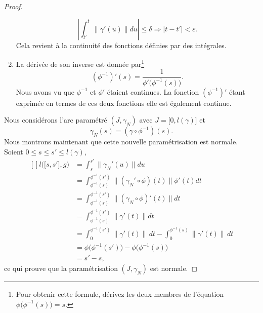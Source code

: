 \begin{proof}
\begin{enumerate}
            \begin{equation}
                |   \int_{t'}^t\big\| \gamma'(u) \big\|du  |\leq\delta\Rightarrow | t-t' |<\varepsilon.
            \end{equation}
            Cela revient à la continuité des fonctions définies par des intégrales.
        \item 
            La dérivée de son inverse est donnée par\footnote{Pour obtenir cette formule, dérivez les deux membres de l'équation $\phi\big( \phi^{-1}(s) \big)=s$.} 
            \begin{equation}
                (\phi^{-1})'(s)=\frac{1}{\phi'\big( \phi^{-1}(s) \big)}.
            \end{equation}
            Nous avons vu que $\phi^{-1}$ et $\phi'$ étaient continues. La fonction $(\phi^{-1})'$ étant exprimée en termes de ces deux fonctions elle est également continue.
    \end{enumerate}

    Nous considérons l'arc paramétré $(J,\gamma_N)$ avec $J=\mathopen[ 0 , l(\gamma) \mathclose]$ et 
    \begin{equation}
        \gamma_N(s)=(\gamma\circ\phi^{-1})(s).
    \end{equation}
    Nous montrons maintenant que cette nouvelle paramétrisation est normale. Soient $0\leq s\leq s'\leq l(\gamma)$,
    \begin{equation}
        \begin{aligned}[]
            l\big( \mathopen[ s , s' \mathclose],g \big)&=\int_s^{s'}\big\| \gamma_N'(u) \big\|du\\
            &=\int_{\phi^{-1}(s)}^{\phi^{-1}(s')}\big\| (\gamma_N'\circ\phi)(t) \big\|\phi'(t)dt\\
            &=\int_{\phi^{-1}(s)}^{\phi^{-1}(s')}\big\| (\gamma_N\circ\phi)'(t) \big\|dt\\
            &=\int_{\phi^{-1}(s)}^{\phi^{-1}(s')}\big\| \gamma'(t) \big\|dt\\
            &=\int_{0}^{\phi^{-1}(s')}\big\| \gamma'(t) \big\|\,dt -\int_0^{\phi^{-1}(s)}\big\| \gamma'(t) \big\|\,dt \\
            &=\phi\big( \phi^{-1}(s') \big)-\phi\big( \phi^{-1}(s) \big)\\
            &=s'-s,
        \end{aligned}
    \end{equation}
    ce qui prouve que la paramétrisation $(J,\gamma_N)$ est normale.
\end{proof}

